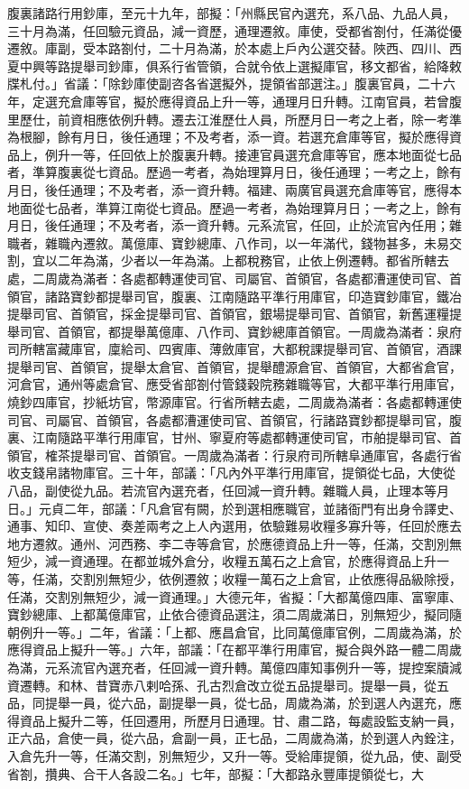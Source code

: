 \begin{pinyinscope}
 腹裏諸路行用鈔庫，至元十九年，部擬：「州縣民官內選充，系八品、九品人員，三十月為滿，任回驗元資品，減一資歷，通理遷敘。庫使，受都省劄付，任滿從優遷敘。庫副，受本路劄付，二十月為滿，於本處上戶內公選交替。陜西、四川、西夏中興等路提舉司鈔庫，俱系行省管領，合就令依上選擬庫官，移文都省，給降敕牒札付。」省議：「除鈔庫使副咨各省選擬外，提領省部選注。」腹裏官員，二十六年，定選充倉庫等官，擬於應得資品上升一等，通理月日升轉。江南官員，若曾腹里歷仕，前資相應依例升轉。遷去江淮歷仕人員，所歷月日一考之上者，除一考準為根腳，餘有月日，後任通理；不及考者，添一資。若選充倉庫等官，擬於應得資品上，例升一等，任回依上於腹裏升轉。接連官員選充倉庫等官，應本地面從七品者，準算腹裏從七資品。歷過一考者，為始理算月日，後任通理；一考之上，餘有月日，後任通理；不及考者，添一資升轉。福建、兩廣官員選充倉庫等官，應得本地面從七品者，準算江南從七資品。歷過一考者，為始理算月日；一考之上，餘有月日，後任通理；不及考者，添一資升轉。元系流官，任回，止於流官內任用；雜職者，雜職內遷敘。萬億庫、寶鈔總庫、八作司，以一年滿代，錢物甚多，未易交割，宜以二年為滿，少者以一年為滿。上都稅務官，止依上例遷轉。都省所轄去處，二周歲為滿者：各處都轉運使司官、司屬官、首領官，各處都漕運使司官、首領官，諸路寶鈔都提舉司官，腹裏、江南隨路平準行用庫官，印造寶鈔庫官，鐵冶提舉司官、首領官，採金提舉司官、首領官，銀場提舉司官、首領官，新舊運糧提舉司官、首領官，都提舉萬億庫、八作司、寶鈔總庫首領官。一周歲為滿者：泉府司所轄富藏庫官，廩給司、四賓庫、薄斂庫官，大都稅課提舉司官、首領官，酒課提舉司官、首領官，提舉太倉官、首領官，提舉醴源倉官、首領官，大都省倉官，河倉官，通州等處倉官、應受省部劄付管錢穀院務雜職等官，大都平準行用庫官，燒鈔四庫官，抄紙坊官，幣源庫官。行省所轄去處，二周歲為滿者：各處都轉運使司官、司屬官、首領官，各處都漕運使司官、首領官，行諸路寶鈔都提舉司官，腹裏、江南隨路平準行用庫官，甘州、寧夏府等處都轉運使司官，市舶提舉司官、首領官，榷茶提舉司官、首領官。一周歲為滿者：行泉府司所轄阜通庫官，各處行省收支錢帛諸物庫官。三十年，部議：「凡內外平準行用庫官，提領從七品，大使從八品，副使從九品。若流官內選充者，任回減一資升轉。雜職人員，止理本等月日。」元貞二年，部議：「凡倉官有闕，於到選相應職官，並諸衙門有出身令譯史、通事、知印、宣使、奏差兩考之上人內選用，依驗難易收糧多寡升等，任回於應去地方遷敘。通州、河西務、李二寺等倉官，於應德資品上升一等，任滿，交割別無短少，減一資通理。在都並城外倉分，收糧五萬石之上倉官，於應得資品上升一等，任滿，交割別無短少，依例遷敘；收糧一萬石之上倉官，止依應得品級除授，任滿，交割別無短少，減一資通理。」大德元年，省擬：「大都萬億四庫、富寧庫、寶鈔總庫、上都萬億庫官，止依合德資品選注，須二周歲滿日，別無短少，擬同隨朝例升一等。」二年，省議：「上都、應昌倉官，比同萬億庫官例，二周歲為滿，於應得資品上擬升一等。」六年，部議：「在都平準行用庫官，擬合與外路一體二周歲為滿，元系流官內選充者，任回減一資升轉。萬億四庫知事例升一等，提控案牘減資遷轉。和林、昔寶赤八剌哈孫、孔古烈倉改立從五品提舉司。提舉一員，從五品，同提舉一員，從六品，副提舉一員，從七品，周歲為滿，於到選人內選充，應得資品上擬升二等，任回遷用，所歷月日通理。甘、肅二路，每處設監支納一員，正六品，倉使一員，從六品，倉副一員，正七品，二周歲為滿，於到選人內銓注，入倉先升一等，任滿交割，別無短少，又升一等。受給庫提領，從九品，使、副受省劄，攢典、合干人各設二名。」七年，部擬：「大都路永豐庫提領從七，大
\end{pinyinscope}
